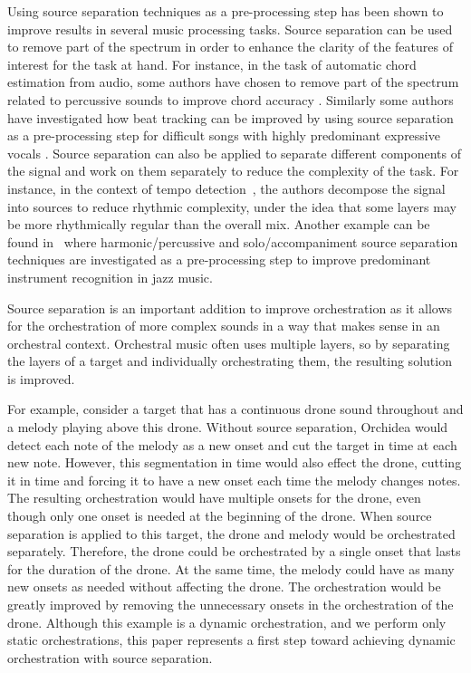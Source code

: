 \documentclass{article}
\begin{document}
	Using source separation techniques as a pre-processing step has been shown to improve results in several music processing tasks. Source separation can be used to remove part of the spectrum in order to enhance the clarity of the features of interest for the task at hand. For instance, in the task of automatic chord estimation from audio, some authors have chosen to remove part of the spectrum related to percussive sounds to improve chord accuracy \cite{Reed_al2009}. Similarly some authors have investigated how beat tracking can be improved by using source separation as a pre-processing step for difficult songs with highly predominant expressive vocals \cite{ZapGom2012}. Source separation can also be applied to separate different components of the signal and work on them separately to reduce the complexity of the task. For instance, in the context of tempo detection~\cite{ChoRae2009}, the authors decompose the signal into sources to reduce rhythmic complexity, under the idea that some layers may be more rhythmically regular than the overall mix. Another example can be found in~\cite{GomAbecan2018} where harmonic/percussive and solo/accompaniment source separation techniques are investigated as a pre-processing step to improve predominant instrument recognition in jazz music.
		
	Source separation is an important addition to improve orchestration as it allows for the orchestration of more complex sounds in a way that makes sense in an orchestral context. Orchestral music often uses multiple layers, so by separating the layers of a target and individually orchestrating them, the resulting solution is improved. 
		
	For example, consider a target that has a continuous drone sound throughout and a melody playing above this drone. Without source separation, Orchidea would detect each note of the melody as a new onset and cut the target in time at each new note. However, this segmentation in time would also effect the drone, cutting it in time and forcing it to have a new onset each time the melody changes notes. The resulting orchestration would have multiple onsets for the drone, even though only one onset is needed at the beginning of the drone. When source separation is applied to this target, the drone and melody would be orchestrated separately. Therefore, the drone could be orchestrated by a single onset that lasts for the duration of the drone. At the same time, the melody could have as many new onsets as needed without affecting the drone. The orchestration would be greatly improved by removing the unnecessary onsets in the orchestration of the drone. Although this example is a dynamic orchestration, and we perform only static orchestrations, this paper represents a first step toward achieving dynamic orchestration with source separation.
		
\end{document}
